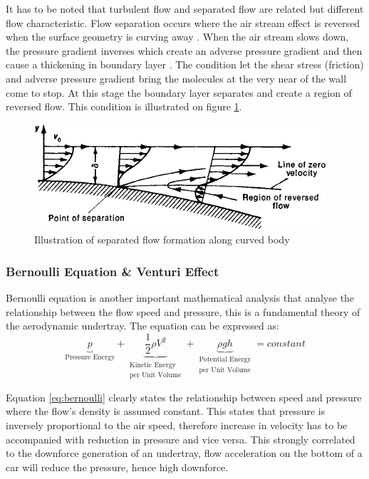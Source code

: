 \noindent It has to be noted that turbulent flow and separated flow are related but different flow characteristic. Flow separation occurs where the air stream effect is reversed when the surface geometry is curving away . When the air stream slows down, the pressure gradient inverses which create an adverse pressure gradient and then cause a thickening in boundary layer \cite{Scibor-Rylski1984RoadAerodynamics}. The condition let the shear stress (friction) and adverse pressure gradient bring the molecules at the very near of the wall come to stop. At this stage the boundary layer separates  and create a region of reversed flow. This condition is illustrated on figure \ref{fig:flow separation}.

\begin{figure}[!ht]
    \centering
    \includegraphics[scale= 0.8]{Figures/flow_separation.png}
    \caption{Illustration of separated flow formation along curved body \cite{Anonymous1979SeparationDictionary}}
    \label{fig:flow separation}
\end{figure}

\subsubsection{Bernoulli Equation \& Venturi Effect}
Bernoulli equation is another important mathematical analysis that analyse the relationship between the flow speed and pressure, this is a fundamental theory of the aerodynamic undertray. The equation can be expressed as:
\begin{equation}
   \underbrace{p}_\textrm{Pressure Energy} + \underbrace{\frac{1}{2} \rho V^{2}}_{\substack{\text{Kinetic Energy} \\ \text{per Unit Volume}}} + \underbrace{\rho g h}_{\substack{\text{Potential Energy} \\ \text{per Unit Volume}}} = constant
    \label{eq:bernoulli}
\end{equation}

Equation \ref{eq:bernoulli} clearly states the relationship between speed and pressure where the flow's density is assumed constant. This states that pressure is inversely proportional to the air speed, therefore increase in velocity has to be accompanied with reduction in pressure and vice versa. This strongly correlated to the downforce generation of an undertray, flow acceleration on the bottom of a car will reduce the pressure, hence high downforce.

